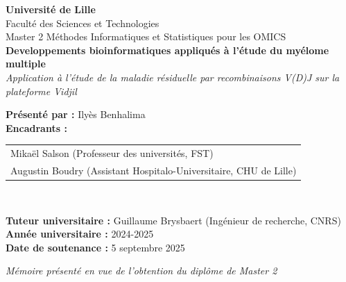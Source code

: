 \begin{titlepage}
    \centering
    \vspace*{1cm}

    {\Large \textbf{Université de Lille}}\\[0.5cm]
    {\large Faculté des Sciences et Technologies}\\[0.5cm]
    {\large Master 2 Méthodes Informatiques et Statistiques pour les OMICS}\\[2cm]

    {\Huge \bfseries Developpements bioinformatiques appliqués à l'étude du myélome multiple}\\[1cm]
    {\LARGE \textit{Application à l'étude de la maladie résiduelle par recombinaisons V(D)J sur la plateforme Vidjil}}\\[2.5cm]

    \begin{flushleft}
    \textbf{Présenté par :} Ilyès Benhalima\\
    \textbf{Encadrants :}
    \begin{tabular}[t]{@{}l}
        Mikaël Salson (Professeur des universités, FST) \\
        Augustin Boudry (Assistant Hospitalo-Universitaire, CHU de Lille)
    \end{tabular}\\

    \vspace{1em}

    \textbf{Tuteur universitaire :} Guillaume Brysbaert (Ingénieur de recherche, CNRS)\\[1.5cm]

    \textbf{Année universitaire :} 2024-2025\\
    \textbf{Date de soutenance :} 5 septembre 2025\\
    \end{flushleft}

    \vfill

    \textit{Mémoire présenté en vue de l'obtention du diplôme de Master 2}\\[2cm]


\end{titlepage}
